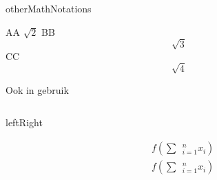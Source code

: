 \documentclass[presentatie.tex]{subfiles}
\begin{document}
\begin{saveblock}{otherMathNotations}
	\begin{highlightblock}[gobble=8,linewidth=0.5\textwidth,
		framexleftmargin=0.25em,xleftmargin=0.25em]
		AA \(\sqrt{2}\)
		BB \[\sqrt{3}\]
		CC $$ \sqrt{4} $$
	\end{highlightblock}
\end{saveblock}

\addtorecentlist{\textbackslash [ \textellipsis\textbackslash]}

\begin{frame}{Ook in gebruik}
	\begin{columns}
		\begin{column}{0.5\textwidth}
		\end{column}
		\begin{column}{0.5\textwidth}
		\end{column}
	\end{columns}


\end{frame}


\begin{saveblock}{leftRight}
	\begin{highlightblock}[gobble=8,linewidth=\textwidth,framexleftmargin=0.25em]
		\begin{align*}
			&f(\sum~~_{i=1}^{n}x_i)\\
			&f\left(\sum~~_{i=1}^{n}x_i\right)
		\end{align*}
	\end{highlightblock}
\end{saveblock}
\end{document}
